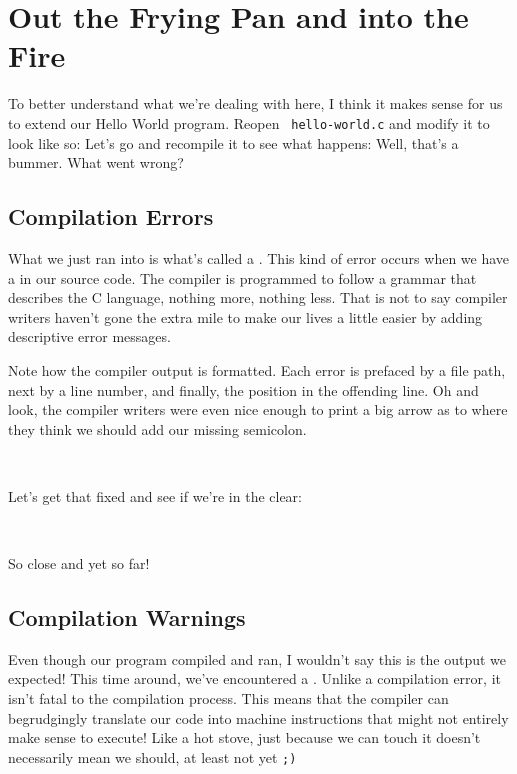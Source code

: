 \section{Out the Frying Pan and into the Fire}

To better understand what we're dealing with here, I think it makes
sense for us to extend our Hello World program.  Reopen \texttt{%
hello-world.c} and modify it to look like so:
\noindent
Let's go and recompile it to see what happens:
\noindent
Well, that's a bummer.  What went wrong?

\subsection{Compilation Errors}

What we just ran into is what's called a .
This kind of error occurs when we have a  in our
source code.  The compiler is programmed to follow a grammar that
describes the C language, nothing more, nothing less.  That is not to
say compiler writers haven't gone the extra mile to make our lives a
little easier by adding descriptive error messages.

Note how the compiler output is formatted.  Each error is prefaced by a
file path, next by a line number, and finally, the position in the
offending line.  Oh and look, the compiler writers were even nice enough
to print a big arrow as to where they think we should add our missing
semicolon.

\

\noindent
Let's get that fixed and see if we're in the clear:
\noindent
{}
\noindent
{}
\noindent

\

\noindent
So close and yet so far!

\subsection{Compilation Warnings}

Even though our program compiled and ran, I wouldn't say this is the
output we expected!  This time around, we've encountered a .  Unlike a compilation error, it isn't fatal to the
compilation process.  This means that the compiler can begrudgingly
translate our code into machine instructions that might not entirely
make sense to execute!  Like a hot stove, just because we can touch it
doesn't necessarily mean we should, at least not yet \texttt{;)}


